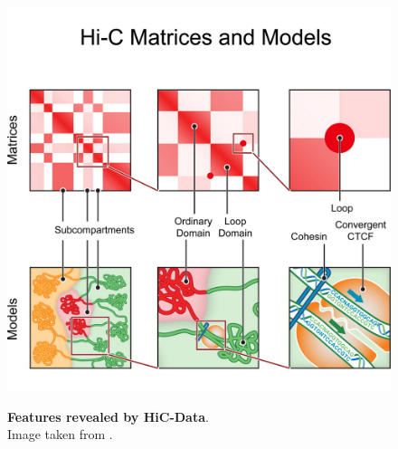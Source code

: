 \begin{figure}[t]
\begin{centering}
    {\includegraphics[scale=1.5]{figures/background/HiCMatricesModels.jpg}}
    \caption[Features revealed by HiC-Data]
    {\textbf{Features revealed by HiC-Data}.\\Image taken from \cite{rao20143d}.}

    \label{fig:HiCMatricesModels}
\end{centering}
\end{figure}


